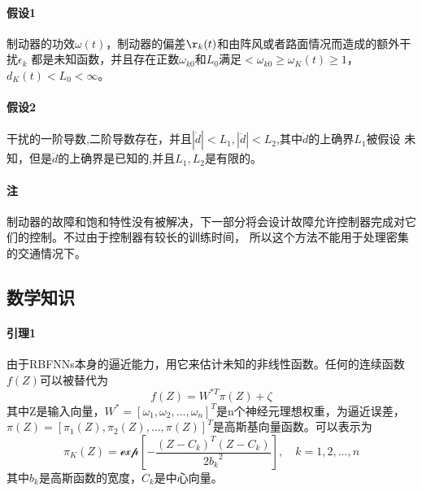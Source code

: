 \documentclass{cjc}
\begin{document}
    \paragraph{假设1}制动器的功效$\omega (t)$，制动器的偏差$\r_k(t)$和由阵风或者路面情况而造成的额外干扰$\epsilon _k$
    都是未知函数，并且存在正数$\omega_{k0}$和$L_0$满足$<\omega _{k0} \ge\omega _K(t) \ge 1$，$d_K(t) < L_0 <\infty$。
    \paragraph{假设2}干扰的一阶导数,二阶导数存在，并且$|\dot{d}|<L_1,|\ddot{d}|<L_2$,其中$\dot{d}$的上确界$L_1$被假设
    未知，但是$\ddot{d}$的上确界是已知的,并且$L_1,L_2$是有限的。
    \paragraph{注}制动器的故障和饱和特性没有被解决，下一部分将会设计故障允许控制器完成对它们的控制。不过由于控制器有较长的训练时间，
    所以这个方法不能用于处理密集的交通情况下。

    



    \subsection{数学知识}

    
    \paragraph{引理1}
    由于RBFNNs本身的逼近能力，用它来估计未知的非线性函数。任何的连续函数$f(Z)$可以被替代为\:
    \begin{equation}
      f(Z) = W^{*T} \pi(Z) + \zeta 
    \end{equation}
    其中Z是输入向量，$W^* = {[\omega_1, \omega_2, ... ,\omega_n ]}^T$是n个神经元理想权重，\zeta 为逼近误差，
    $\pi(Z) = [\pi _1(Z),\pi_2 (Z),...,\pi(Z)]^T$是高斯基向量函数。可以表示为\:
    \begin{equation}
      \pi _K(Z) = \mathcal{exp}[-\frac{{(Z-C_k)}^T(Z-C_k)}{2{b_k}^2}], \quad k = 1,2 ,..., n
    \end{equation}
    其中$b_k$是高斯函数的宽度，$C_k$是中心向量。
\end{document}
